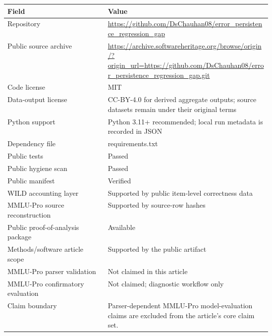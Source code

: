 \begin{tabular}{lp{0.62\linewidth}}
\toprule
Field & Value \\
\midrule
Repository & \url{https://github.com/DsChauhan08/error_persistence_regression_gap} \\
Public source archive & \url{https://archive.softwareheritage.org/browse/origin/?origin_url=https://github.com/DsChauhan08/error_persistence_regression_gap.git} \\
Code license & MIT \\
Data-output license & CC-BY-4.0 for derived aggregate outputs; source datasets remain under their original terms \\
Python support & Python 3.11+ recommended; local run metadata is recorded in JSON \\
Dependency file & requirements.txt \\
Public tests & Passed \\
Public hygiene scan & Passed \\
Public manifest & Verified \\
WILD accounting layer & Supported by public item-level correctness data \\
MMLU-Pro source reconstruction & Supported by source-row hashes \\
Public proof-of-analysis package & Available \\
Methods/software article scope & Supported by the public artifact \\
MMLU-Pro parser validation & Not claimed in this article \\
MMLU-Pro confirmatory evaluation & Not claimed; diagnostic workflow only \\
\midrule
Claim boundary & Parser-dependent MMLU-Pro model-evaluation claims are excluded from the article's core claim set. \\
\bottomrule
\end{tabular}
